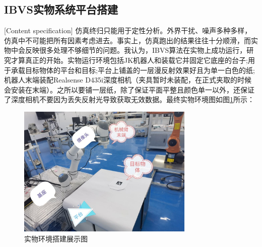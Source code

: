 \documentclass[fontset=fandol,type=bachelor,campus=harbin]{hithesisbook}
\begin{document}
\subsection{IBVS实物系统平台搭建}[Content specification]
仿真终归只能用于定性分析。外界干扰、噪声多种多样，仿真中不可能把所有因素考虑进去。事实上，仿真跑出的结果往往十分顺滑，而实物中会反映很多处理不够细节的问题。我认为，IBVS算法在实物上成功运行，研究才算真正的开始。实物运行环境包括JK机器人和装载它并固定它底座的台子;用于承载目标物体的平台和目标;平台上铺盖的一层漫反射效果好且为单一白色的纸;机器人末端装配Realsense D435i深度相机（夹具暂时未装配，在正式夹取的时候会安装在末端）。之所以要铺一层纸，除了保证平面平整且颜色单一以外，还保证了深度相机不要因为丢失反射光导致获取无效数据。最终实物环境图如图\ref{实物环境搭建展示图}所示：
\begin{figure}[h]
\centering
\includegraphics[width = 0.75\textwidth]{chapter2/实物环境搭建展示图}
\caption{实物环境搭建展示图}
\label{实物环境搭建展示图}
\end{figure}
\end{document}
